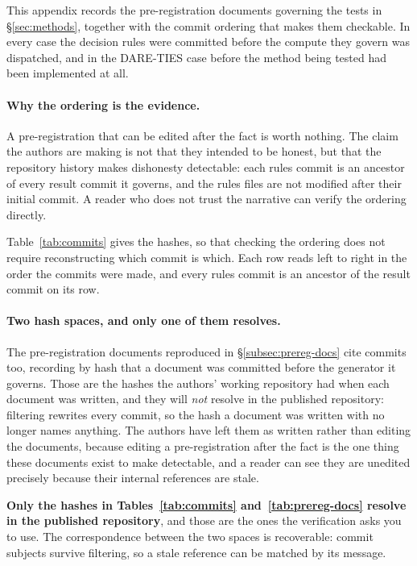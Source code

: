 This appendix records the pre-registration documents governing the tests
in \S\ref{sec:methods}, together with the commit ordering that makes them
checkable. In every case the decision rules were committed before the
compute they govern was dispatched, and in the DARE-TIES case before the
method being tested had been implemented at all.

\paragraph{Why the ordering is the evidence.} A pre-registration that can
be edited after the fact is worth nothing. The claim the authors are making is not
that they intended to be honest, but that the repository history makes
dishonesty detectable: each rules commit is an ancestor of every result
commit it governs, and the rules files are not modified after their
initial commit. A reader who does not trust the narrative can verify the
ordering directly.

Table~\ref{tab:commits} gives the hashes, so that checking the ordering does
not require reconstructing which commit is which. Each row reads left to
right in the order the commits were made, and every rules commit is an
ancestor of the result commit on its row.

\paragraph{Two hash spaces, and only one of them resolves.} The
pre-registration documents reproduced in \S\ref{subsec:prereg-docs} cite
commits too, recording by hash that a document was committed before the
generator it governs. Those are the hashes the authors' working repository had when
each document was written, and they will \emph{not} resolve in the published
repository: filtering rewrites every commit, so the hash a document was
written with no longer names anything. The authors have left them as written rather
than editing the documents, because editing a pre-registration after the fact
is the one thing these documents exist to make detectable, and a reader can
see they are unedited precisely because their internal references are stale.

\textbf{Only the hashes in Tables~\ref{tab:commits} and~\ref{tab:prereg-docs}
resolve in the published repository}, and those are the ones the verification
asks you to use. The correspondence between the two spaces is recoverable:
commit subjects survive filtering, so a stale reference can be matched by its
message.


